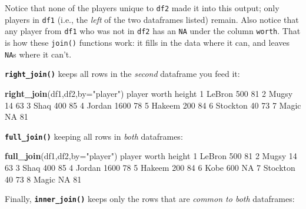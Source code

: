 \documentclass[
]{book}
\newenvironment{Shaded}{\begin{snugshade}}{\end{snugshade}}
\newcommand{\DataTypeTok}[1]{\textcolor[rgb]{0.13,0.29,0.53}{#1}}
\newcommand{\DecValTok}[1]{\textcolor[rgb]{0.00,0.00,0.81}{#1}}
\newcommand{\KeywordTok}[1]{\textcolor[rgb]{0.13,0.29,0.53}{\textbf{#1}}}
\newcommand{\NormalTok}[1]{#1}
\newcommand{\OtherTok}[1]{\textcolor[rgb]{0.56,0.35,0.01}{#1}}
\newcommand{\StringTok}[1]{\textcolor[rgb]{0.31,0.60,0.02}{#1}}
\begin{document}
Notice that none of the players unique to \texttt{df2} made it into this output; only players in \texttt{df1} (i.e., the \emph{left} of the two dataframes listed) remain. Also notice that any player from \texttt{df1} who was not in \texttt{df2} has an \texttt{NA} under the column \texttt{worth}. That is how these \texttt{join()} functions work: it fills in the data where it can, and leaves \texttt{NA}s where it can't.

\textbf{\texttt{right\_join()}} keeps all rows in the \emph{second} dataframe you feed it:

\begin{Shaded}
\begin{Highlighting}[]
\KeywordTok{right_join}\NormalTok{(df1,df2,}\DataTypeTok{by=}\StringTok{"player"}\NormalTok{)}
\NormalTok{    player worth height}
\DecValTok{1}\NormalTok{   LeBron   }\DecValTok{500}     \DecValTok{81}
\DecValTok{2}\NormalTok{    Mugsy    }\DecValTok{14}     \DecValTok{63}
\DecValTok{3}\NormalTok{     Shaq   }\DecValTok{400}     \DecValTok{85}
\DecValTok{4}\NormalTok{   Jordan  }\DecValTok{1600}     \DecValTok{78}
\DecValTok{5}\NormalTok{   Hakeem   }\DecValTok{200}     \DecValTok{84}
\DecValTok{6}\NormalTok{ Stockton    }\DecValTok{40}     \DecValTok{73}
\DecValTok{7}\NormalTok{    Magic    }\OtherTok{NA}     \DecValTok{81}
\end{Highlighting}
\end{Shaded}

\textbf{\texttt{full\_join()}} keeping all rows in \emph{both} dataframes:

\begin{Shaded}
\begin{Highlighting}[]
\KeywordTok{full_join}\NormalTok{(df1,df2,}\DataTypeTok{by=}\StringTok{"player"}\NormalTok{)}
\NormalTok{    player worth height}
\DecValTok{1}\NormalTok{   LeBron   }\DecValTok{500}     \DecValTok{81}
\DecValTok{2}\NormalTok{    Mugsy    }\DecValTok{14}     \DecValTok{63}
\DecValTok{3}\NormalTok{     Shaq   }\DecValTok{400}     \DecValTok{85}
\DecValTok{4}\NormalTok{   Jordan  }\DecValTok{1600}     \DecValTok{78}
\DecValTok{5}\NormalTok{   Hakeem   }\DecValTok{200}     \DecValTok{84}
\DecValTok{6}\NormalTok{     Kobe   }\DecValTok{600}     \OtherTok{NA}
\DecValTok{7}\NormalTok{ Stockton    }\DecValTok{40}     \DecValTok{73}
\DecValTok{8}\NormalTok{    Magic    }\OtherTok{NA}     \DecValTok{81}
\end{Highlighting}
\end{Shaded}

Finally, \textbf{\texttt{inner\_join()}} keeps only the rows that are \emph{common to both} dataframes:
\end{document}
